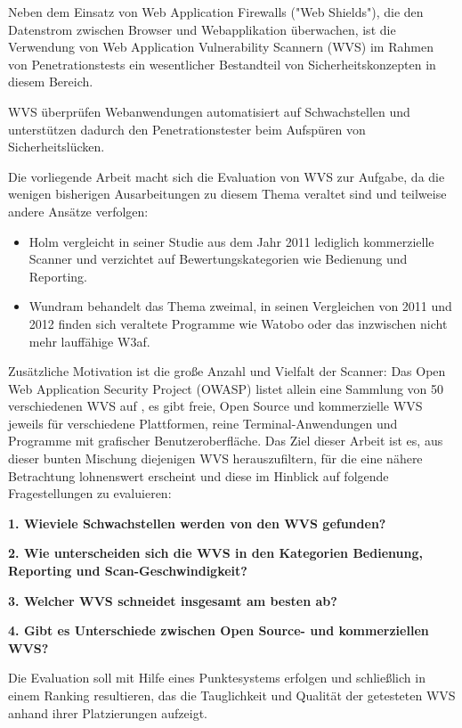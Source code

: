 \documentclass[12pt,oneside,a4paper,parskip]{scrbook}
\begin{document}
Neben dem Einsatz von Web Application Firewalls ("Web Shields"), die den Datenstrom zwischen Browser und Webapplikation überwachen, ist die Verwendung von Web Application Vulnerability Scannern (WVS) im Rahmen von Penetrationstests ein wesentlicher Bestandteil von Sicherheitskonzepten in diesem Bereich.

WVS überprüfen Webanwendungen automatisiert auf Schwachstellen und unterstützen dadurch den Penetrationstester beim Aufspüren von Sicherheitslücken.

Die vorliegende Arbeit macht sich die Evaluation von WVS zur Aufgabe, da die wenigen bisherigen Ausarbeitungen zu diesem Thema veraltet sind und teilweise andere Ansätze verfolgen:

\begin{itemize}
  \item
  Holm \cite{Holm} vergleicht in seiner Studie aus dem Jahr 2011 lediglich kommerzielle Scanner und verzichtet auf Bewertungskategorien wie Bedienung und Reporting.
  \item
  Wundram \cite{Wundram}\cite{Wundram2} behandelt das Thema zweimal, in seinen Vergleichen von 2011 und 2012 finden sich veraltete Programme wie Watobo oder das inzwischen nicht mehr lauffähige W3af.
\end{itemize}

Zusätzliche Motivation ist die große Anzahl und Vielfalt der Scanner: Das Open Web Application Security Project (OWASP) listet allein eine Sammlung von 50 verschiedenen WVS auf \cite{OWASPtools}, es gibt freie, Open Source und kommerzielle WVS jeweils für verschiedene Plattformen, reine Terminal-Anwendungen und Programme mit grafischer Benutzeroberfläche.
Das Ziel dieser Arbeit ist es, aus dieser bunten Mischung diejenigen WVS herauszufiltern, für die eine nähere Betrachtung lohnenswert erscheint und diese im Hinblick auf folgende Fragestellungen zu evaluieren:

\textbf{1. Wieviele Schwachstellen werden von den WVS gefunden?}

\textbf{2. Wie unterscheiden sich die WVS in den Kategorien Bedienung, Reporting und Scan-Geschwindigkeit?}

\textbf{3. Welcher WVS schneidet insgesamt am besten ab?}

\textbf{4. Gibt es Unterschiede zwischen Open Source- und kommerziellen WVS?}

Die Evaluation soll mit Hilfe eines Punktesystems erfolgen und schließlich in einem Ranking resultieren, das die Tauglichkeit und Qualität der getesteten WVS anhand ihrer Platzierungen aufzeigt.
\end{document}
